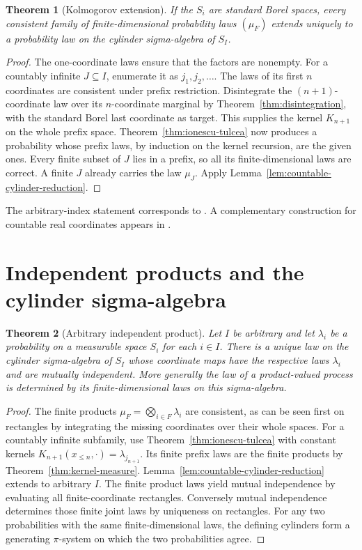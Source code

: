 \documentclass[11pt,oneside,openany]{book}
\theoremstyle{plain}
\newtheorem{theorem}{Theorem}[chapter]
\theoremstyle{definition}
\theoremstyle{remark}
\begin{document}
\begin{theorem}[Kolmogorov extension]\label{thm:kolmogorov-extension}
If the \(S_i\) are standard Borel spaces, every consistent family of finite-dimensional probability laws \((\mu_F)\) extends uniquely to a probability law on the cylinder sigma-algebra of \(S_I\).
\end{theorem}
\begin{proof}
The one-coordinate laws ensure that the factors are nonempty. For a countably infinite \(J\subseteq I\), enumerate it as \(j_1,j_2,\ldots\). The laws of its first \(n\) coordinates are consistent under prefix restriction. Disintegrate the \((n+1)\)-coordinate law over its \(n\)-coordinate marginal by Theorem~\ref{thm:disintegration}, with the standard Borel last coordinate as target. This supplies the kernel \(K_{n+1}\) on the whole prefix space. Theorem~\ref{thm:ionescu-tulcea} now produces a probability whose prefix laws, by induction on the kernel recursion, are the given ones. Every finite subset of \(J\) lies in a prefix, so all its finite-dimensional laws are correct. A finite \(J\) already carries the law \(\mu_J\). Apply Lemma~\ref{lem:countable-cylinder-reduction}.
\end{proof}

The arbitrary-index statement corresponds to \cite[Theorem 8.23, pp.~179--180]{Kallenberg}. A complementary construction for countable real coordinates appears in \cite[Theorem 2.1.21, p.~53, and Appendix A.3, pp.~464--466]{Durrett}.

\section{Independent products and the cylinder sigma-algebra}\label{p05-03}

\begin{theorem}[Arbitrary independent product]\label{thm:independent-product}
Let \(I\) be arbitrary and let \(\lambda_i\) be a probability on a measurable space \(S_i\) for each \(i\in I\). There is a unique law on the cylinder sigma-algebra of \(S_I\) whose coordinate maps have the respective laws \(\lambda_i\) and are mutually independent. More generally the law of a product-valued process is determined by its finite-dimensional laws on this sigma-algebra.
\end{theorem}
\begin{proof}
The finite products \(\mu_F=\bigotimes_{i\in F}\lambda_i\) are consistent, as can be seen first on rectangles by integrating the missing coordinates over their whole spaces. For a countably infinite subfamily, use Theorem~\ref{thm:ionescu-tulcea} with constant kernels \(K_{n+1}(x_{\le n},\cdot)=\lambda_{j_{n+1}}\). Its finite prefix laws are the finite products by Theorem~\ref{thm:kernel-measure}. Lemma~\ref{lem:countable-cylinder-reduction} extends to arbitrary \(I\). The finite product laws yield mutual independence by evaluating all finite-coordinate rectangles. Conversely mutual independence determines those finite joint laws by uniqueness on rectangles. For any two probabilities with the same finite-dimensional laws, the defining cylinders form a generating \(\pi\)-system on which the two probabilities agree.
\end{proof}
\end{document}
